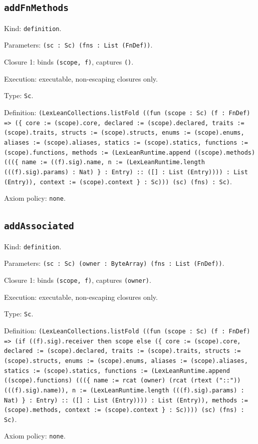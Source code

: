 \documentclass[11pt]{article}
\begin{document}
\subsection*{\texttt{addFnMethods}}
\noindent Kind: \texttt{definition}.\par
\noindent Parameters: \texttt{(sc : Sc) (fns : List (FnDef))}.\par
\noindent Closure 1: binds \texttt{(scope, f)}, captures \texttt{()}.\par
\noindent Execution: executable, non-escaping closures only.\par
\noindent Type: \texttt{Sc}.\par
\noindent Definition: \texttt{(LexLeanCollections.listFold ((fun (scope : Sc) (f : FnDef) => (\{ core := (scope).core, declared := (scope).declared, traits := (scope).traits, structs := (scope).structs, enums := (scope).enums, aliases := (scope).aliases, statics := (scope).statics, functions := (scope).functions, methods := (LexLeanRuntime.append ((scope).methods) (((\{ name := ((f).sig).name, n := (LexLeanRuntime.length (((f).sig).params) : Nat) \} : Entry) :: ([] : List (Entry)))) : List (Entry)), context := (scope).context \} : Sc))) (sc) (fns) : Sc)}.\par
\noindent Axiom policy: \texttt{none}.\par
\subsection*{\texttt{addAssociated}}
\noindent Kind: \texttt{definition}.\par
\noindent Parameters: \texttt{(sc : Sc) (owner : ByteArray) (fns : List (FnDef))}.\par
\noindent Closure 1: binds \texttt{(scope, f)}, captures \texttt{(owner)}.\par
\noindent Execution: executable, non-escaping closures only.\par
\noindent Type: \texttt{Sc}.\par
\noindent Definition: \texttt{(LexLeanCollections.listFold ((fun (scope : Sc) (f : FnDef) => (if ((f).sig).receiver then scope else (\{ core := (scope).core, declared := (scope).declared, traits := (scope).traits, structs := (scope).structs, enums := (scope).enums, aliases := (scope).aliases, statics := (scope).statics, functions := (LexLeanRuntime.append ((scope).functions) (((\{ name := rcat (owner) (rcat (rtext ("::")) (((f).sig).name)), n := (LexLeanRuntime.length (((f).sig).params) : Nat) \} : Entry) :: ([] : List (Entry)))) : List (Entry)), methods := (scope).methods, context := (scope).context \} : Sc)))) (sc) (fns) : Sc)}.\par
\noindent Axiom policy: \texttt{none}.\par
\end{document}
